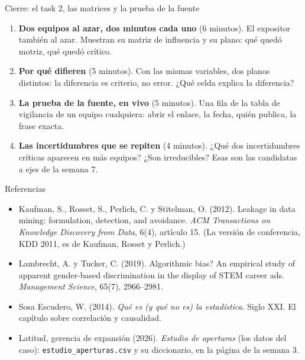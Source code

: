 \documentclass{beamer}
\begin{document}
\begin{frame}{Cierre: el task 2, las matrices y la prueba de la fuente}
\begin{enumerate}\itemsep7pt
  \item \textbf{Dos equipos al azar, dos minutos cada uno} (6 minutos). El expositor también al azar. Muestran su matriz de influencia y su plano: qué quedó motriz, qué quedó crítico.
  \item \textbf{Por qué difieren} (5 minutos). Con las mismas variables, dos planos distintos: la diferencia es criterio, no error. ¿Qué celda explica la diferencia?
  \item \textbf{La prueba de la fuente, en vivo} (5 minutos). Una fila de la tabla de vigilancia de un equipo cualquiera: abrir el enlace, la fecha, quién publica, la frase exacta.
  \item \textbf{Las incertidumbres que se repiten} (4 minutos). ¿Qué dos incertidumbres críticas aparecen en más equipos? ¿Son irreducibles? Esas son las candidatas a ejes de la semana 7.
\end{enumerate}
\end{frame}

\begin{frame}{Referencias}
\small
\begin{itemize}\itemsep4pt
  \item Kaufman, S., Rosset, S., Perlich, C. y Stitelman, O. (2012). Leakage in data mining: formulation, detection, and avoidance. \emph{ACM Transactions on Knowledge Discovery from Data}, 6(4), artículo 15. (La versión de conferencia, KDD 2011, es de Kaufman, Rosset y Perlich.)
  \item Lambrecht, A. y Tucker, C. (2019). Algorithmic bias? An empirical study of apparent gender-based discrimination in the display of STEM career ads. \emph{Management Science}, 65(7), 2966--2981.
  \item Sosa Escudero, W. (2014). \emph{Qué es (y qué no es) la estadística}. Siglo XXI. El capítulo sobre correlación y causalidad.
  \item Latitud, gerencia de expansión (2026). \emph{Estudio de aperturas} (los datos del caso): \texttt{estudio\_aperturas.csv} y su diccionario, en la página de la semana 3.
\end{itemize}
\end{frame}
\end{document}
